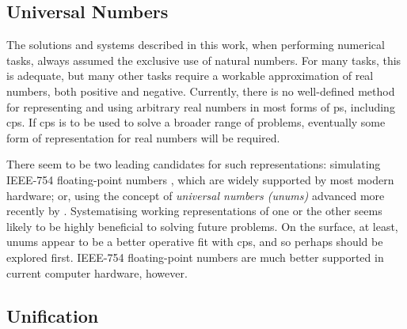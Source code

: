 

\subsection{Universal Numbers}

The solutions and systems described in this work, when performing numerical tasks, always assumed the exclusive use of natural numbers.  For many tasks, this is adequate, but many other tasks require a workable approximation of real numbers, both positive and negative.  Currently, there is no well-defined method for representing and using arbitrary real numbers in most forms of \gls{ps}, including \gls{cps}.  If \gls{cps} is to be used to solve a broader range of problems, eventually some form of representation for real numbers will be required.

There seem to be two leading candidates for such representations:  simulating IEEE-754 floating-point numbers \cite{ieee754}, which are widely supported by most modern hardware;  or, using the concept of \emph{universal numbers (unums)} advanced more recently by \citeauthor{Gustafson2017} \cite{Gustafson2017}.  Systematising working representations of one or the other seems likely to be highly beneficial to solving future problems.  On the surface, at least, unums appear to be a better operative fit with \gls{cps}, and so perhaps should be explored first.  IEEE-754 floating-point numbers are much better supported in current computer hardware, however.


\subsection{Unification}

